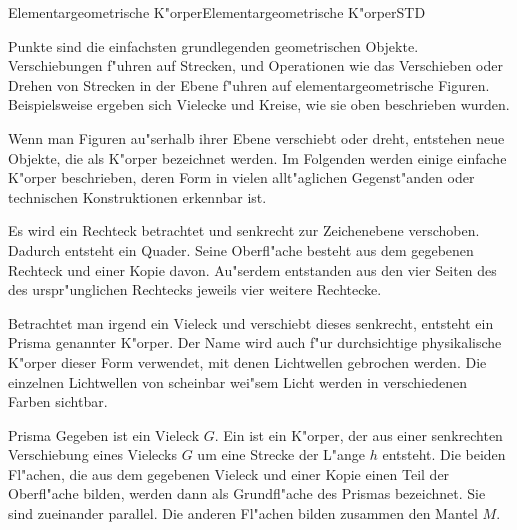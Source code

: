 \begin{MXContent}{Elementargeometrische K"orper}{Elementargeometrische K"orper}{STD}%

Punkte sind die einfachsten grundlegenden geometrischen Objekte. Verschiebungen
f"uhren auf Strecken, und Operationen wie das Verschieben oder Drehen von 
Strecken in der Ebene f"uhren auf elementargeometrische Figuren. 
Beispielsweise ergeben sich Vielecke und Kreise, wie sie oben beschrieben 
wurden.

Wenn man Figuren au"serhalb ihrer Ebene verschiebt oder dreht, entstehen neue
Objekte, die als K"orper bezeichnet werden. Im Folgenden werden einige einfache 
K"orper beschrieben, deren Form in vielen allt"aglichen Gegenst"anden oder 
technischen Konstruktionen erkennbar ist.

\begin{MExample}
Es wird ein Rechteck betrachtet und senkrecht zur Zeichenebene verschoben.
Dadurch entsteht ein Quader. Seine Oberfl"ache besteht aus dem gegebenen
Rechteck und einer Kopie davon. Au"serdem entstanden aus den vier Seiten
des des urspr"unglichen Rechtecks jeweils vier weitere Rechtecke.
\end{MExample}

Betrachtet man irgend ein Vieleck und verschiebt dieses senkrecht, entsteht
ein Prisma genannter K"orper. Der Name wird auch f"ur durchsichtige physikalische
K"orper dieser Form verwendet, mit denen Lichtwellen gebrochen werden. Die 
einzelnen Lichtwellen von scheinbar wei"sem Licht werden in verschiedenen Farben
sichtbar.

\begin{MXInfo}{Prisma}
Gegeben ist ein Vieleck $G$.
Ein  ist ein K"orper, der aus einer senkrechten 
Verschiebung eines Vielecks $G$ um eine Strecke der L"ange $h$ entsteht. 
Die beiden Fl"achen, die aus dem gegebenen Vieleck und einer Kopie einen 
Teil der Oberfl"ache bilden, werden dann als Grundfl"ache des Prismas 
bezeichnet. Sie sind zueinander parallel. 
Die anderen Fl"achen bilden zusammen den Mantel $M$.


\end{MXInfo}
\end{MXContent}

